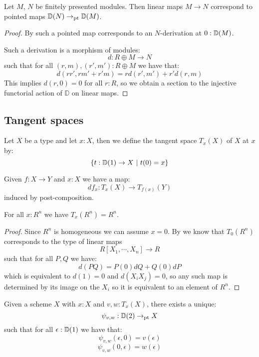 \begin{lemma}\label{equivalence-module-infinitesimal}
Let $M$, $N$ be finitely presented modules. Then linear maps $M \to N$ correspond to
pointed maps $\mathbb{D}(N) \to_{\mathrm{pt}} \mathbb{D}(M)$. 
\end{lemma}

\begin{proof}
By  such a pointed map corresponds to an $N$-derivation at $0:\mathbb{D}(M)$.

Such a derivation is a morphism of modules:
\[d:R\oplus M\to N\]
such that for all $(r,m),(r',m'):R\oplus M$ we have that:
\[d(rr',rm'+r'm) = rd(r',m')+r'd(r,m)\]
This implies $d(r,0) = 0$ for all $r : R$, so we obtain a section to the injective functorial action of $\mathbb{D}$ on linear maps.
\end{proof}


\subsection{Tangent spaces}

\begin{definition}
Let $X$ be a type and let $x:X$, then we define the tangent space $T_x(X)$ of $X$ at $x$ by:
\[\{t:\D(1)\to X\ |\ t(0)=x\}\]
\end{definition}

\begin{definition}
Given $f:X\to Y$ and $x:X$ we have a map:
\[df_x : T_x(X)\to T_{f(x)}(Y)\]
induced by post-composition.
\end{definition}

\begin{lemma}\label{An-dimension-n}
For all $x:R^n$ we have $T_x(R^n) = R^n$.
\end{lemma}

\begin{proof}
Since $R^n$ is homogeneous we can assume $x=0$. By  we know that $T_0(R^n)$ corresponds to the type of linear maps
\[R[X_1,\cdots,X_n] \to R\]
such that for all $P,Q$ we have:
\[d(PQ) = P(0)dQ + Q(0)dP\]
which is equivalent to $d(1) = 0$ and $d(X_iX_j) = 0$, so any such map is determined by its image on the $X_i$ so it is equivalent to an element of $R^n$.
\end{proof}

\begin{lemma}\label{from-D1-to-D2}
Given a scheme $X$ with $x:X$ and $v,w:T_x(X)$, there exists a unique:
\[\psi_{v,w} : \mathbb{D}(2)\to_{\mathrm{pt}} X\]
such that for all $\epsilon:\mathbb{D}(1)$ we have that:
\[\psi_{v,w}(\epsilon,0) = v(\epsilon)\]
\[\psi_{v,w}(0,\epsilon) = w(\epsilon)\]
\end{lemma}

